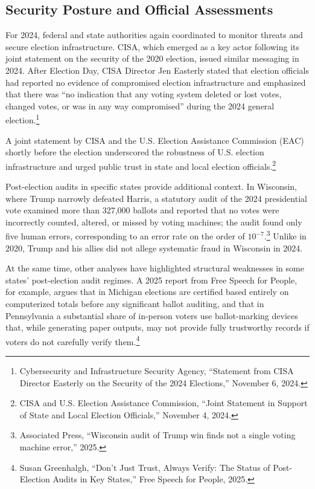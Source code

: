 \documentclass[12pt]{article}
\begin{document}
\subsection{Security Posture and Official Assessments}

For 2024, federal and state authorities again coordinated to monitor threats and secure election infrastructure. CISA, which emerged as a key actor following its joint statement on the security of the 2020 election, issued similar messaging in 2024. After Election Day, CISA Director Jen Easterly stated that election officials had reported no evidence of compromised election infrastructure and emphasized that there was \enquote{no indication that any voting system deleted or lost votes, changed votes, or was in any way compromised} during the 2024 general election.\footnote{Cybersecurity and Infrastructure Security Agency, ``Statement from CISA Director Easterly on the Security of the 2024 Elections,'' November 6, 2024.}

A joint statement by CISA and the U.S. Election Assistance Commission (EAC) shortly before the election underscored the robustness of U.S. election infrastructure and urged public trust in state and local election officials.\footnote{CISA and U.S. Election Assistance Commission, ``Joint Statement in Support of State and Local Election Officials,'' November 4, 2024.}

Post-election audits in specific states provide additional context. In Wisconsin, where Trump narrowly defeated Harris, a statutory audit of the 2024 presidential vote examined more than 327,000 ballots and reported that no votes were incorrectly counted, altered, or missed by voting machines; the audit found only five human errors, corresponding to an error rate on the order of $10^{-7}$.\footnote{Associated Press, ``Wisconsin audit of Trump win finds not a single voting machine error,'' 2025.} Unlike in 2020, Trump and his allies did not allege systematic fraud in Wisconsin in 2024.

At the same time, other analyses have highlighted structural weaknesses in some states' post-election audit regimes. A 2025 report from Free Speech for People, for example, argues that in Michigan elections are certified based entirely on computerized totals before any significant ballot auditing, and that in Pennsylvania a substantial share of in-person voters use ballot-marking devices that, while generating paper outputs, may not provide fully trustworthy records if voters do not carefully verify them.\footnote{Susan Greenhalgh, ``Don't Just Trust, Always Verify: The Status of Post-Election Audits in Key States,'' Free Speech for People, 2025.}
\end{document}
